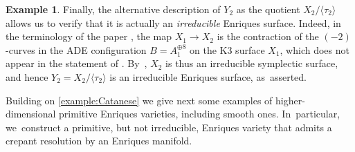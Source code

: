 \documentclass[10pt]{amsart}
\theoremstyle{plain}
\theoremstyle{definition}
\newtheorem{exa}[thm]{Example}
\begin{document}
\begin{exa}
Finally, the alternative description of $Y_2$ as the quotient $X_2 / \langle \tau_2 \rangle$ allows us to verify that it is actually an \emph{irreducible} Enriques surface. Indeed, in the terminology of the paper \cite{GPP24}, the map $X_1 \to X_2$ is the contraction of the $(-2)$-curves in the ADE configuration $B = A_1^{\oplus 8}$ on the K3 surface $X_1$, which does not appear in the statement of \cite[Th.\,3.6]{GPP24}. By~\cite[Th.\,3.7]{GPP24}, $X_2$ is thus an irreducible symplectic surface, and hence $Y_2 = X_2 / \langle \tau_2 \rangle$ is an irreducible Enriques surface, as~asserted.
\end{exa}

Building on \autoref{example:Catanese} we give next some examples of higher-dimensional primitive Enriques varieties, including smooth ones. In~particular, we~construct a primitive, but not irreducible, Enriques variety that admits a crepant resolution by an Enriques manifold.
\end{document}
